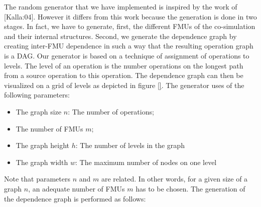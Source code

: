 The random generator that we have implemented is inspired by the work of [Kalla:04]. However it differs from this work because the generation is done in two stages. In fact, we have to generate, first, the different FMUs of the co-simulation and their internal structures. Second, we generate the dependence graph by creating inter-FMU dependence in such a way that the resulting operation graph is a DAG. Our generator is based on a technique of assignment of operations to levels. The level of an operation is the number operations on the longest path from a source operation to this operation. The dependence graph can then be visualized on a grid of levels as depicted in figure \ref{}. The generator uses of the following parameters:
\begin{itemize}
\item The graph size $n$: The number of operations;
\item The number of FMUs $m$;
\item The graph height $h$: The number of levels in the graph
\item The graph width $w$: The maximum number of nodes on one level
\end{itemize}
Note that parameters $n$ and $m$ are related. In other words, for a given size of a graph $n$, an adequate number of FMUs $m$ has to be chosen. The generation of the dependence graph is performed as follows:
